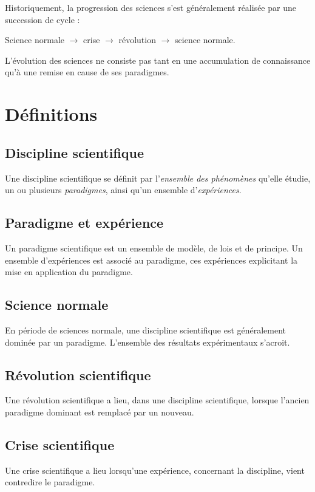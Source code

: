 

Historiquement, la progression des sciences s'est généralement réalisée par une succession de cycle :
\begin{center}
Science normale $\to$ crise $\to$ révolution $\to$ science normale.
\end{center}
L'évolution des sciences ne consiste pas tant en une accumulation de connaissance qu'à une remise en cause de ses paradigmes.

\section{Définitions}

  \subsection{Discipline scientifique}
Une discipline scientifique se définit par l'{\it ensemble des phénomènes} qu'elle étudie, un ou plusieurs {\it paradigmes}, ainsi qu'un ensemble d'{\it expériences}.

  \subsection{Paradigme et expérience}
Un paradigme scientifique est un ensemble de modèle, de lois et de principe. Un ensemble d'expériences est associé au paradigme, ces expériences explicitant la mise en application du paradigme.

  \subsection{Science normale}
En période de sciences normale, une discipline scientifique est généralement dominée par un paradigme. L'ensemble des résultats expérimentaux s'acroit.

  \subsection{Révolution scientifique}
Une révolution scientifique a lieu, dans une discipline scientifique, lorsque l'ancien paradigme dominant est remplacé par un nouveau.

  \subsection{Crise scientifique}
Une crise scientifique a lieu lorsqu'une expérience, concernant la discipline, vient contredire le paradigme.

